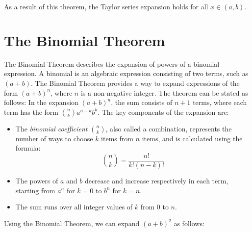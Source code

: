 As a result of this theorem, the Taylor series expansion holds for all $x \in (a,b)$.
\section{The Binomial Theorem}
\noindent The Binomial Theorem describes the expansion of powers of a binomial expression. 
A binomial is an algebraic expression consisting of two terms, such as \( (a + b) \). 
The Binomial Theorem provides a way to expand expressions of the form \( (a + b)^n \), where \( n \) is a non-negative integer. 
The theorem can be stated as follows:
In the expansion \( (a + b)^n \), the sum consists of \( n + 1 \) terms, where each term has the form \( \binom{n}{k} a^{n-k} b^k \). 
The key components of the expansion are:
\begin{itemize}
    \item The \textit{binomial coefficient} \( \binom{n}{k} \), also called a combination, represents the number of ways to choose \( k \) items from \( n \) items, and is calculated using the formula:
    \[\binom{n}{k} = \frac{n!}{k!(n-k)!}\]
    \item The powers of \( a \) and \( b \) decrease and increase respectively in each term, starting from \( a^n \) for \( k = 0 \) to \( b^n \) for \( k = n \).
    \item The sum runs over all integer values of \( k \) from 0 to \( n \).
\end{itemize}
\noindent Using the Binomial Theorem, we can expand \( (a + b)^2 \) as follows:
